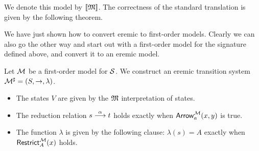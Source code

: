 \NI We denote this model by $\lbrack\!\lbrack \frak{M} \rbrack\!\rbrack$. The correctness of the
standard translation is given by the following theorem.

We have just shown how to convert eremic to first-order models.
Clearly we can also go the other way and start out with a first-order
model for the signature defined above, and convert it
to an eremic model.

\begin{definition}
Let $\mathcal{M}$ be a first-order model for $\mathcal{S}$. We construct an
eremic transition system $\mathcal{M}^{\sharp} = (S, \rightarrow,
\lambda)$.

\begin{itemize}

\item The states $V$ are given by the $\frak{M}$ interpretation of states.

\item The reduction relation $s \stackrel{\alpha}{\longrightarrow} t$ holds exactly when
  $\mathsf{Arrow}^{\mathcal{M}}_a(x, y)$ is true.

\item The function $\lambda$ is given by the following clause:
  $\lambda(s) = A$ exactly when $\mathsf{Restrict}_{A}^{\mathcal{M}}(x)$
  holds.

\end{itemize}

\end{definition}


